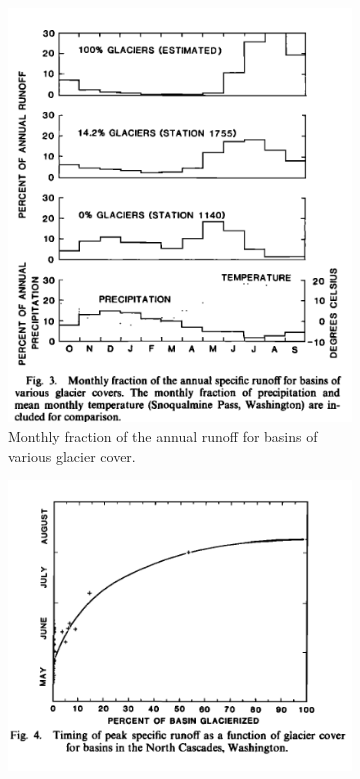 \documentclass{article}
\begin{document}
\begin{figure}[h]
    \centering
    \begin{subfigure}[b]{0.49\textwidth}
        \centering
        \includegraphics[width=\textwidth]{Plots/fountain_1985_fig3.png}
        \caption{Monthly fraction of the annual runoff for basins of various glacier cover.}
        \label{fig:subfig1}
    \end{subfigure}
    \hfill
    \begin{subfigure}[b]{0.49\textwidth}
        \centering
        \includegraphics[width=\textwidth]{Plots/fountain_1985_fig4.png}

\end{subfigure}
\end{figure}
\end{document}
